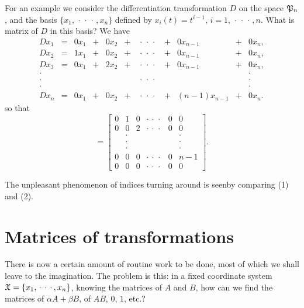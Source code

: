 For an example we consider the differentiation transformation \(D\) on
the space \(\mathfrak{P}_n\), and the basis \(\{x_1, \,\cdot\,\cdot\,\cdot\,, x_n\}\) defined by \(x_i(t) = t^{i-1}\), \(i = 1, \,\cdot\,\cdot\,\cdot\,, n\). What is matrix of \(D\) in this basis? We have
{\small\begin{equation}
    \begin{array}{ccccccccrcc}
        Dx_1 &=& 0x_1 &+& 0x_2 &+ &\,\cdot\,\cdot\,\cdot&+& 0x_{n-1} &+& 0x_n, \\
        Dx_2 &=& 1x_1 &+& 0x_2 &+ &\,\cdot\,\cdot\,\cdot&+& 0x_{n-1} &+& 0x_n, \\
        Dx_3 &=& 0x_1 &+& 2x_2 &+ &\,\cdot\,\cdot\,\cdot&+& 0x_{n-1} &+& 0x_n, \\
        \cdot &&&&&&  &&&& \cdot \\
        \cdot &&&&&& \,\cdot\,\cdot\,\cdot\, &&&& \cdot \\
        \cdot &&&&&& &&&& \cdot \\
        Dx_n &=& 0x_1 &+& 0x_2 &+ &\,\cdot\,\cdot\,\cdot&+& (n-1)x_{n-1} &+& 0x_n.
    \end{array}
\end{equation}}
so that
\begin{equation}
    [D] = \begin{bmatrix}
        0 & 1 & 0 & \cdot\,\cdot\,\cdot & 0 & 0 \\
        0 & 0 & 2 & \cdot\,\cdot\,\cdot & 0 & 0 \\
        {} & \cdot & {} & {} & {} & \cdot \\
        {} & \cdot & {} & {} & {} & \cdot \\
        {} & \cdot & {} & {} & {} & \cdot \\
        0 & 0 & 0 & \cdot\,\cdot\,\cdot & 0 & n-1 \\
        0 & 0 & 0 & \cdot\,\cdot\,\cdot & 0 & 0
    \end{bmatrix}.
\end{equation}

The unpleasant phenomenon of indices turning around is seenby comparing (1) and
(2).

\section{Matrices of transformations}

There is now a certain amount of routine work to be done, most of which we shall
leave to the imagination. The problem is this: in a fixed coordinate system
\(\frak{X} = \{x_1, \,\cdot\,\cdot\,\cdot\,, x_n\}\), knowing the matrices of
\(A\) and \(B\), how can we find the matrices of \(\alpha A + \beta B\), of
\(AB\), \(0\), \(1\), etc.?

